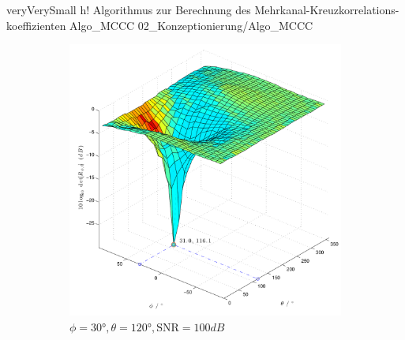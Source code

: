          {veryVerySmall}                                                       %
         {h!}                                                  %
         {Algorithmus zur Berechnung des Mehrkanal-Kreuzkorrelations-koeffizienten}    %
         {Algo_MCCC}                                               %
         {02_Konzeptionierung/Algo_MCCC}                           %

       
\begin{figure}
        \centering
        \begin{subfigure}[b]{0.48\textwidth}
                \centering
                \includegraphics[width=\textwidth]{grafiken/02_Konzeptionierung/Sim_voice_Phi_30_Theta_120_SNR_100dB_log}
                \caption{$\phi=30°,\theta=120°, \mathrm{SNR}=100dB$}
                \label{fig:Sim_Phi_30_Theta_120_dB}
        \end{subfigure}
        ~ %
        \begin{subfigure}[b]{0.48\textwidth}

\end{subfigure}
\end{figure}
